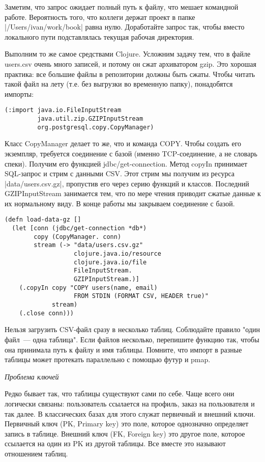Заметим, что запрос ожидает полный путь к файлу, что мешает командной
работе. Вероятность того, что коллеги держат проект в папке
\spverb|/Users/ivan/work/book| равна нулю. Доработайте запрос так, чтобы вместо
локального пути подставлялась текущая рабочая директория.

Выполним то же самое средствами Clojure. Усложним задачу тем, что в файле
users.csv очень много записей, и потому он сжат архиватором gzip. Это хорошая
практика: все большие файлы в репозитории должны быть сжаты. Чтобы читать такой
файл на лету (т.е. без выгрузки во временную папку), понадобятся импорты:

\begin{verbatim}
(:import java.io.FileInputStream
         java.util.zip.GZIPInputStream
         org.postgresql.copy.CopyManager)
\end{verbatim}

Класс CopyManager делает то же, что и команда COPY. Чтобы создать его экземпляр,
требуется соединение с базой (именно TCP-соединение, а не словарь
спеки). Получим его функцией jdbc/get-connection. Метод copyIn принимает
SQL-запрос и стрим с данными CSV. Этот стрим мы получим из ресурса
\spverb|data/users.csv.gz|, пропустив его через серию функций и классов. Последний
GZIPInputStream занимается тем, что по мере чтения приводит сжатые данные к их
нормальному виду. В конце работы мы закрываем соединение с базой.

\begin{verbatim}
(defn load-data-gz []
  (let [conn (jdbc/get-connection *db*)
        copy (CopyManager. conn)
        stream (-> "data/users.csv.gz"
                   clojure.java.io/resource
                   clojure.java.io/file
                   FileInputStream.
                   GZIPInputStream.)]
    (.copyIn copy "COPY users(name, email)
                   FROM STDIN (FORMAT CSV, HEADER true)"
             stream)
    (.close conn)))
\end{verbatim}

Нельзя загрузить CSV-файл сразу в несколько таблиц. Соблюдайте правило "один
файл~--- одна таблица". Если файлов несколько, перепишите функцию так, чтобы она
принимала путь к файлу и имя таблицы. Помните, что импорт в разные таблицы может
протекать параллельно с помощью футур и pmap.

\emph{Проблема ключей}

Редко бывает так, что таблицы существуют сами по себе. Чаще всего они логически
связаны: пользователь ссылается на профиль, заказ на пользователя и так далее. В
классических базах для этого служат первичный и внешний ключи. Первичный ключ
(PK, Primary key) это поле, которое однозначно определяет запись в
таблице. Внешний ключ (FK, Foreign key) это другое поле, которое ссылается на
один из PK из другой таблицы. Все вместе это называют отношением таблиц.

